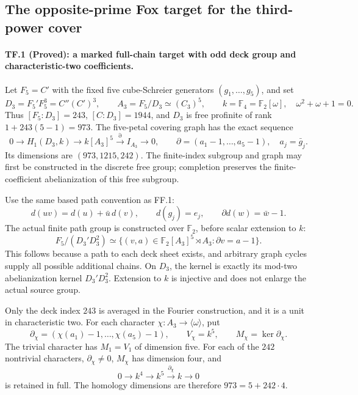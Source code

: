 \subsection*{The opposite-prime Fox target for the third-power cover}

\paragraph{TF.1 (Proved): a marked full-chain target with odd deck group and characteristic-two coefficients.}
Let $F_5=C'$ with the fixed five cube-Schreier generators
$(g_1,\ldots,g_5)$, and set
\[
 D_3=F_5'F_5^3=C''(C')^3,\qquad
 A_3=F_5/D_3\simeq(C_3)^5,\qquad
 k=\mathbb F_4=\mathbb F_2[\omega],\quad
 \omega^2+\omega+1=0.
 \tag{TF.1a}
\]
Thus $[F_5:D_3]=243$, $[C:D_3]=1944$, and $D_3$ is
free profinite of rank $1+243(5-1)=973$. The five-petal
covering graph has the exact sequence
\[
 0\longrightarrow H_1(D_3,k)\longrightarrow k[A_3]^5
 \stackrel{\partial}{\longrightarrow}I_{A_3}
 \longrightarrow0,\qquad
 \partial=(a_1-1,\ldots,a_5-1),\quad a_j=\bar g_j.
 \tag{TF.1b}
\]
Its dimensions are $(973,1215,242)$. The finite-index
subgroup and graph may first be constructed in the discrete
free group; completion preserves the finite-coefficient
abelianization of this free subgroup.

Use the same based path convention as FF.1:
\[
 d(uv)=d(u)+\bar u\,d(v),\qquad d(g_j)=e_j,
                     \qquad\partial d(w)=\bar w-1.
 \tag{TF.1c}
\]
The actual finite path group is constructed over
$\mathbb F_2$, before scalar extension to $k$:
\[
 F_5/(D_3'D_3^2)\simeq
 \{(v,a)\in\mathbb F_2[A_3]^5\rtimes A_3:
                              \partial v=a-1\}.
 \tag{TF.1d}
\]
This follows because a path to each deck sheet exists,
and arbitrary graph cycles supply all possible additional
chains. On $D_3$, the kernel is exactly its mod-two
abelianization kernel $D_3'D_3^2$. Extension to $k$ is
injective and does not enlarge the actual source group.

Only the deck index $243$ is averaged in the Fourier
construction, and it is a unit in characteristic two.
For each character $\chi:A_3\to\langle\omega\rangle$,
put
\[
 \partial_\chi=(\chi(a_1)-1,\ldots,\chi(a_5)-1),
 \qquad V_\chi=k^5,\qquad M_\chi=\ker\partial_\chi.
\]
The trivial character has $M_1=V_1$ of dimension five.
For each of the $242$ nontrivial characters,
$\partial_\chi\ne0$, $M_\chi$ has dimension four, and
\[
             0\longrightarrow k^4\longrightarrow k^5
                     \stackrel{\partial_\chi}{\longrightarrow}k
                     \longrightarrow0
 \tag{TF.1e}
\]
is retained in full. The homology dimensions are therefore
$973=5+242\cdot4$.


